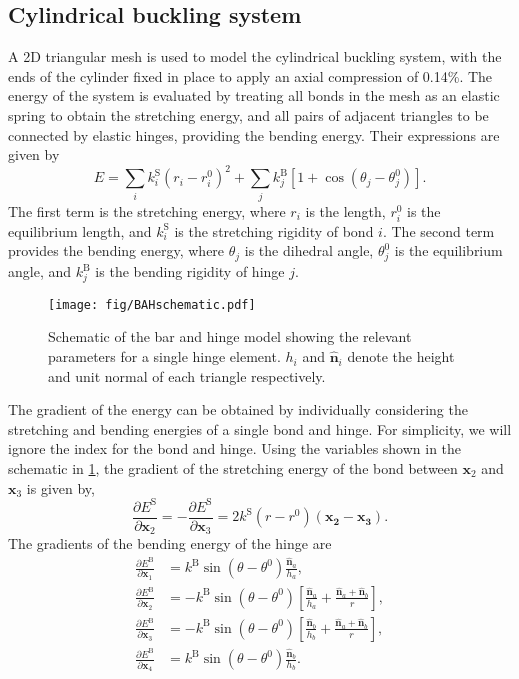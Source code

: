 \documentclass[aip,jcp,reprint,twocolumn]{revtex4-1}
\begin{document}
\subsection{Cylindrical buckling system}
A 2D triangular mesh is used to model the cylindrical buckling system, with the ends of the cylinder fixed in place to apply an axial compression of 0.14\%.
The energy of the system is evaluated by treating all bonds in the mesh as an elastic spring to obtain the stretching energy, and all pairs of adjacent triangles to be connected by elastic hinges, providing the bending energy.
Their expressions are given by
\begin{equation}
  E = \sum_i k^\mathrm{S}_i (r_i - r^0_i)^2 + \sum_j k^\mathrm{B}_j [1 + \cos(\theta_j - \theta^0_j)].
\end{equation}
The first term is the stretching energy, where $r_i$ is the length, $r^0_i$ is the equilibrium length, and $k^\mathrm{S}_i$ is the stretching rigidity of bond $i$.
The second term provides the bending energy, where $\theta_j$ is the dihedral angle, $\theta^0_j$ is the equilibrium angle, and $k^\mathrm{B}_j$ is the bending rigidity of hinge $j$.

\begin{figure}[htb]
  \texttt{[image: fig/BAHschematic.pdf]}
  \caption{\label{fig:BAHschematic}
    Schematic of the bar and hinge model showing the relevant parameters for a single hinge element.
    $h_i$ and $\bm{\hat{n}}_i$ denote the height and unit normal of each triangle respectively.
  }
\end{figure}
The gradient of the energy can be obtained by individually considering the stretching and bending energies of a single bond and hinge.
For simplicity, we will ignore the index for the bond and hinge.
Using the variables shown in the schematic in \cref{fig:BAHschematic}, the gradient of the stretching energy of the bond between $\bm{x}_2$ and $\bm{x}_3$ is given by,
\begin{equation}
  \frac{\partial E^\mathrm{S}}{\partial \bm{x}_2} = - \frac{\partial E^\mathrm{S}}{\partial \bm{x}_3} =
    2 k^\mathrm{S} (r - r^0) (\bm{x_2} - \bm{x_3}).
\end{equation}
The gradients of the bending energy of the hinge are
\begin{align}
  \frac{\partial E^\mathrm{B}}{\partial \bm{x}_1} &= k^\mathrm{B} \sin(\theta - \theta^0) \frac{\bm{\hat{n}}_a}{h_a}, \\
  \frac{\partial E^\mathrm{B}}{\partial \bm{x}_2} &= - k^\mathrm{B} \sin(\theta - \theta^0) \left[\frac{\bm{\hat{n}}_a}{h_a} + \frac{\bm{\hat{n}}_a + \bm{\hat{n}}_b}{r}\right], \\
  \frac{\partial E^\mathrm{B}}{\partial \bm{x}_3} &= - k^\mathrm{B} \sin(\theta - \theta^0) \left[\frac{\bm{\hat{n}}_b}{h_b} + \frac{\bm{\hat{n}}_a + \bm{\hat{n}}_b}{r}\right], \\
  \frac{\partial E^\mathrm{B}}{\partial \bm{x}_4} &= k^\mathrm{B} \sin(\theta - \theta^0) \frac{\bm{\hat{n}}_b}{h_b}.
\end{align}
\end{document}
